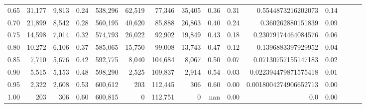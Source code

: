 \begin{tabular}{rrrrrrrrrrrrrrr}
0.65 &  31,177 &   9,813 &  0.24 &  538,296 &   62,519 &   77,346 &   35,405 &  0.36 &  0.31 &     0.5544873216202073 &      0.14 \\
0.70 &  21,899 &   8,542 &  0.28 &  560,195 &   40,620 &   85,888 &   26,863 &  0.40 &  0.24 &      0.360262880151839 &      0.09 \\
0.75 &  14,598 &   7,014 &  0.32 &  574,793 &   26,022 &   92,902 &   19,849 &  0.43 &  0.18 &    0.23079174464084576 &      0.06 \\
0.80 &  10,272 &   6,106 &  0.37 &  585,065 &   15,750 &   99,008 &   13,743 &  0.47 &  0.12 &     0.1396883397929952 &      0.04 \\
0.85 &   7,710 &   5,676 &  0.42 &  592,775 &    8,040 &  104,684 &    8,067 &  0.50 &  0.07 &    0.07130757155147183 &      0.02 \\
0.90 &   5,515 &   5,153 &  0.48 &  598,290 &    2,525 &  109,837 &    2,914 &  0.54 &  0.03 &   0.022394479871575418 &      0.01 \\
0.95 &   2,322 &   2,608 &  0.53 &  600,612 &      203 &  112,445 &      306 &  0.60 &  0.00 &  0.0018004274906652713 &      0.00 \\
1.00 &     203 &     306 &  0.60 &  600,815 &        0 &  112,751 &        0 &   nan &  0.00 &                    0.0 &      0.00 \\
\bottomrule
\end{tabular}
